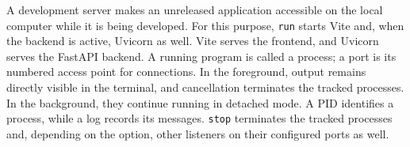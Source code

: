 \begin{beginnerstatement}

A development server makes an unreleased application accessible on the local
computer while it is being developed. For this purpose,
\texttt{run} starts Vite and, when the backend is active, Uvicorn as well.
Vite serves the frontend, and Uvicorn serves the FastAPI backend. A running
program is called a process; a port is its numbered access point for
connections. In the foreground, output remains directly visible in the
terminal, and cancellation terminates the tracked processes. In the
background, they continue running in detached mode. A PID identifies a
process, while a log records its messages. \texttt{stop} terminates the
tracked processes and, depending on the option, other listeners on their
configured ports as well.

\end{beginnerstatement}
